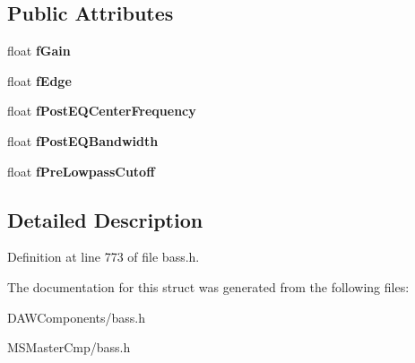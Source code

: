 \subsection*{Public Attributes}
\begin{DoxyCompactItemize}
\item 
\hypertarget{struct_b_a_s_s___d_x8___d_i_s_t_o_r_t_i_o_n_aae2a552fff6dec886b79c64c3c985890_aae2a552fff6dec886b79c64c3c985890}{float {\bfseries f\-Gain}}\label{struct_b_a_s_s___d_x8___d_i_s_t_o_r_t_i_o_n_aae2a552fff6dec886b79c64c3c985890_aae2a552fff6dec886b79c64c3c985890}

\item 
\hypertarget{struct_b_a_s_s___d_x8___d_i_s_t_o_r_t_i_o_n_a277a36a502bed47facd8be9fe06cfb0e_a277a36a502bed47facd8be9fe06cfb0e}{float {\bfseries f\-Edge}}\label{struct_b_a_s_s___d_x8___d_i_s_t_o_r_t_i_o_n_a277a36a502bed47facd8be9fe06cfb0e_a277a36a502bed47facd8be9fe06cfb0e}

\item 
\hypertarget{struct_b_a_s_s___d_x8___d_i_s_t_o_r_t_i_o_n_a90e66d9e0cfc132efa0e68429c5cf81d_a90e66d9e0cfc132efa0e68429c5cf81d}{float {\bfseries f\-Post\-E\-Q\-Center\-Frequency}}\label{struct_b_a_s_s___d_x8___d_i_s_t_o_r_t_i_o_n_a90e66d9e0cfc132efa0e68429c5cf81d_a90e66d9e0cfc132efa0e68429c5cf81d}

\item 
\hypertarget{struct_b_a_s_s___d_x8___d_i_s_t_o_r_t_i_o_n_a0825b5f7724ac6c4c9de9d71c4a48d0b_a0825b5f7724ac6c4c9de9d71c4a48d0b}{float {\bfseries f\-Post\-E\-Q\-Bandwidth}}\label{struct_b_a_s_s___d_x8___d_i_s_t_o_r_t_i_o_n_a0825b5f7724ac6c4c9de9d71c4a48d0b_a0825b5f7724ac6c4c9de9d71c4a48d0b}

\item 
\hypertarget{struct_b_a_s_s___d_x8___d_i_s_t_o_r_t_i_o_n_a1397454ba65a389b7b2a41bb93d10290_a1397454ba65a389b7b2a41bb93d10290}{float {\bfseries f\-Pre\-Lowpass\-Cutoff}}\label{struct_b_a_s_s___d_x8___d_i_s_t_o_r_t_i_o_n_a1397454ba65a389b7b2a41bb93d10290_a1397454ba65a389b7b2a41bb93d10290}

\end{DoxyCompactItemize}


\subsection{Detailed Description}


Definition at line 773 of file bass.\-h.



The documentation for this struct was generated from the following files\-:\begin{DoxyCompactItemize}
\item 
D\-A\-W\-Components/bass.\-h\item 
M\-S\-Master\-Cmp/bass.\-h\end{DoxyCompactItemize}
